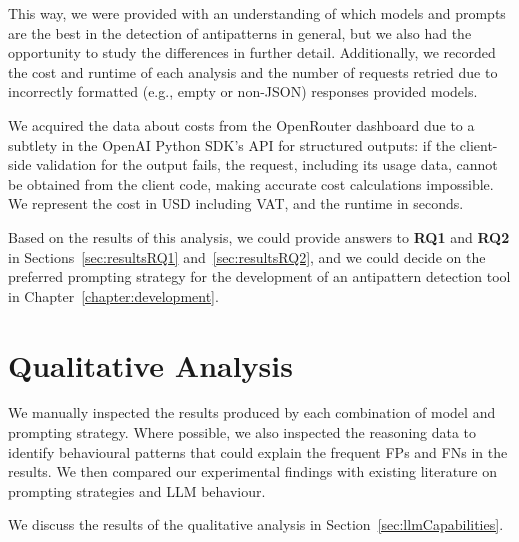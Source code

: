 This way, we were provided with an understanding of which models and prompts are the best in the detection of antipatterns in general, but we also had the opportunity to study the differences in further detail. Additionally, we recorded the cost and runtime of each analysis and the number of requests retried due to incorrectly formatted (e.g., empty or non-JSON) responses provided models.

We acquired the data about costs from the OpenRouter dashboard due to a subtlety in the OpenAI Python SDK's API for structured outputs: if the client-side validation for the output fails, the request, including its usage data, cannot be obtained from the client code, making accurate cost calculations impossible. We represent the cost in USD including VAT, and the runtime in seconds.

Based on the results of this analysis, we could provide answers to \textbf{RQ1} and \textbf{RQ2} in Sections~\ref{sec:resultsRQ1} and~\ref{sec:resultsRQ2}, and we could decide on the preferred prompting strategy for the development of an antipattern detection tool in Chapter~\ref{chapter:development}.

\section{Qualitative Analysis}

We manually inspected the results produced by each combination of model and prompting strategy. Where possible, we also inspected the reasoning data to identify behavioural patterns that could explain the frequent FPs and FNs in the results. We then compared our experimental findings with existing literature on prompting strategies and LLM behaviour.

We discuss the results of the qualitative analysis in Section~\ref{sec:llmCapabilities}.
